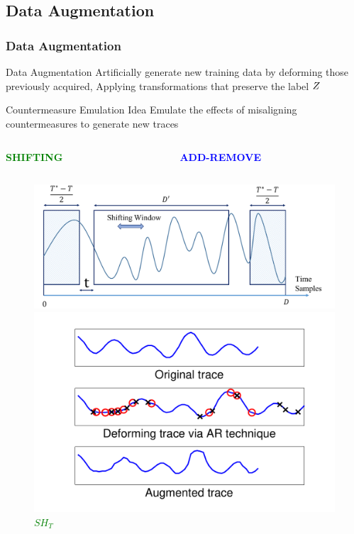 %


\subsection{Data Augmentation}
\begin{frame}
\frametitle{Data Augmentation}
\vspace{-11pt}
\begin{block}{Data Augmentation}
Artificially generate new training data by deforming those previously acquired,
Applying transformations that preserve the label $Z$
\end{block}
\vspace{-5pt}
\begin{block}{Countermeasure Emulation Idea}
Emulate the effects of misaligning countermeasures to generate new traces
\begin{columns}
\begin{column}{0.35\textwidth}
\begin{large}
\textbf{\textcolor{green}{SHIFTING}}
\vspace{-8pt}
\end{large}
\end{column}
\begin{column}{0.35\textwidth}
\begin{large}
\textbf{\textcolor{blue}{ADD-REMOVE}}
\vspace{-8pt}
\end{large}
\end{column}
\end{columns}
\begin{figure}
  \begin{minipage}[b]{0.5\linewidth}
    \centering
    \includegraphics[width=\linewidth]{../Figures/CHES2017/Shifting_window.pdf} 
    \caption{\textcolor{green}{$SH_T$}}
  \end{minipage}%
  \begin{minipage}[b]{0.5\linewidth}
    \centering
    \includegraphics[width=.7\linewidth]{../Figures/CHES2017/AR_example.pdf} 

\end{minipage}
\end{figure}
\end{block}
\end{frame}
